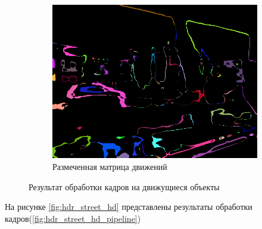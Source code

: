 \begin{figure}[!tbp]
\begin{subfigure}{.5\textwidth}
    \includegraphics[width=\textwidth]{img/car_movementMap.png}
    \caption{ Размеченная матрица движений}
    \label{fig:car_movemap}
  \end{subfigure}
  \caption { Результат обработки кадров на движущиеся объекты}
  \label{fig:hdr_car_move}
\end{figure}


На рисунке \ref{fig:hdr_street_hd} представлены результаты обработки кадров(\ref{fig:hdr_street_hd_pipeline})

